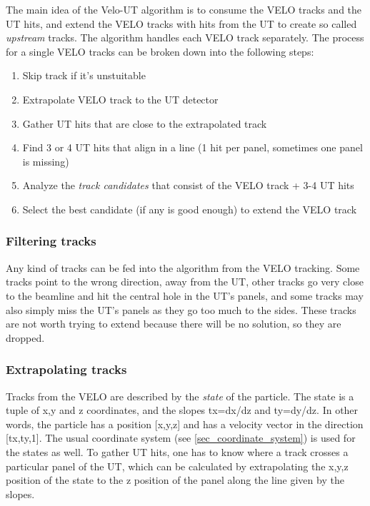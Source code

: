 \documentclass[12pt]{article}
\begin{document}
The main idea of the Velo-UT algorithm is to consume the VELO tracks and the UT hits, and extend the VELO tracks with hits from the UT to create so called \textit{upstream} tracks. The algorithm handles each VELO track separately. The process for a single VELO tracks can be broken down into the following steps:

\begin{enumerate}
	\item Skip track if it's unstuitable
	\item Extrapolate VELO track to the UT detector
	\item Gather UT hits that are close to the extrapolated track
	\item Find 3 or 4 UT hits that align in a line (1 hit per panel, sometimes one panel is missing)
	\item Analyze the \textit{track candidates} that consist of the VELO track + 3-4 UT hits
	\item Select the best candidate (if any is good enough) to extend the VELO track
\end{enumerate}


\subsubsection{Filtering tracks}

Any kind of tracks can be fed into the algorithm from the VELO tracking. Some tracks point to the wrong direction, away from the UT, other tracks go very close to the beamline and hit the central hole in the UT's panels, and some tracks may also simply miss the UT's panels as they go too much to the sides. These tracks are not worth trying to extend because there will be no solution, so they are dropped.


\subsubsection{Extrapolating tracks}

Tracks from the VELO are described by the \textit{state} of the particle. The state is a tuple of x,y and z coordinates, and the slopes tx=dx/dz and ty=dy/dz. In other words, the particle has a position [x,y,z] and has a velocity vector in the direction [tx,ty,1]. The usual coordinate system (see \ref{sec_coordinate_system}) is used for the states as well. To gather UT hits, one has to know where a track crosses a particular panel of the UT, which can be calculated by extrapolating the x,y,z position of the state to the z position of the panel along the line given by the slopes.
\end{document}
